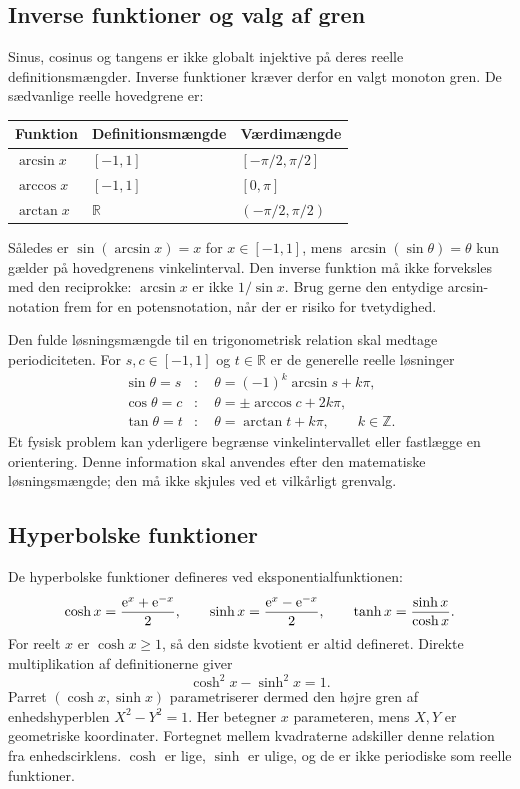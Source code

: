 \subsection{Inverse funktioner og valg af gren}
Sinus, cosinus og tangens er ikke globalt injektive på deres reelle
definitionsmængder. Inverse funktioner kræver derfor en valgt monoton gren.
De sædvanlige reelle hovedgrene er:
\begin{center}
\begin{tabular}{@{}lll@{}}
\toprule
Funktion & Definitionsmængde & Værdimængde\\
\midrule
$\arcsin x$ & $[-1,1]$ & $[-\pi/2,\pi/2]$\\
$\arccos x$ & $[-1,1]$ & $[0,\pi]$\\
$\arctan x$ & $\mathbb{R}$ & $(-\pi/2,\pi/2)$\\
\bottomrule
\end{tabular}
\end{center}
Således er $\sin(\arcsin x)=x$ for $x\in[-1,1]$, mens
$\arcsin(\sin\theta)=\theta$ kun gælder på hovedgrenens vinkelinterval.
Den inverse funktion må ikke forveksles med den reciprokke:
$\arcsin x$ er ikke $1/\sin x$. Brug gerne den entydige arcsin-notation
frem for en potensnotation, når der er risiko for tvetydighed.

Den fulde løsningsmængde til en trigonometrisk relation skal medtage
periodiciteten. For $s,c\in[-1,1]$ og $t\in\mathbb{R}$ er de generelle
reelle løsninger
\begin{align*}
 \sin\theta=s&:\quad \theta=(-1)^k\arcsin s+k\pi,\\
 \cos\theta=c&:\quad \theta=\pm\arccos c+2k\pi,\\
 \tan\theta=t&:\quad \theta=\arctan t+k\pi,
 \qquad k\in\mathbb{Z}.
\end{align*}
Et fysisk problem kan yderligere begrænse vinkelintervallet eller fastlægge
en orientering. Denne information skal anvendes efter den matematiske
løsningsmængde; den må ikke skjules ved et vilkårligt grenvalg.

\subsection{Hyperbolske funktioner}
De hyperbolske funktioner defineres ved eksponentialfunktionen:
\[
 \cosh x=\frac{\mathrm{e}^x+\mathrm{e}^{-x}}{2},\qquad
 \sinh x=\frac{\mathrm{e}^x-\mathrm{e}^{-x}}{2},\qquad
 \tanh x=\frac{\sinh x}{\cosh x}.
\]
For reelt $x$ er $\cosh x\ge1$, så den sidste kvotient er altid defineret.
Direkte multiplikation af definitionerne giver
\[
 \cosh^2x-\sinh^2x=1.
\]
Parret $(\cosh x,\sinh x)$ parametriserer dermed den højre gren af
enhedshyperblen $X^2-Y^2=1$. Her betegner $x$ parameteren, mens $X,Y$
er geometriske koordinater. Fortegnet mellem kvadraterne adskiller denne
relation fra enhedscirklens. $\cosh$ er lige, $\sinh$ er ulige, og de er
ikke periodiske som reelle funktioner.

